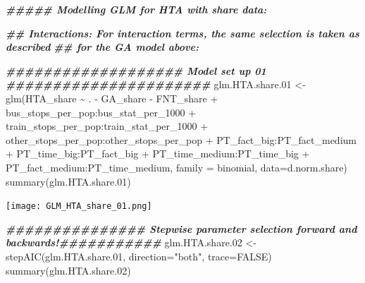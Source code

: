 \documentclass[
]{article}
\newenvironment{Shaded}{\begin{snugshade}}{\end{snugshade}}
\newcommand{\AttributeTok}[1]{\textcolor[rgb]{0.77,0.63,0.00}{#1}}
\newcommand{\ConstantTok}[1]{\textcolor[rgb]{0.00,0.00,0.00}{#1}}
\newcommand{\DocumentationTok}[1]{\textcolor[rgb]{0.56,0.35,0.01}{\textbf{\textit{#1}}}}
\newcommand{\FloatTok}[1]{\textcolor[rgb]{0.00,0.00,0.81}{#1}}
\newcommand{\FunctionTok}[1]{\textcolor[rgb]{0.00,0.00,0.00}{#1}}
\newcommand{\NormalTok}[1]{#1}
\newcommand{\OtherTok}[1]{\textcolor[rgb]{0.56,0.35,0.01}{#1}}
\newcommand{\SpecialCharTok}[1]{\textcolor[rgb]{0.00,0.00,0.00}{#1}}
\newcommand{\StringTok}[1]{\textcolor[rgb]{0.31,0.60,0.02}{#1}}
\begin{document}
\begin{Shaded}
\begin{Highlighting}[]
\DocumentationTok{\#\#\#\#\#  Modelling GLM for HTA with share data:}

\DocumentationTok{\#\# Interactions: For interaction terms, the same selection is taken as described}
\DocumentationTok{\#\# for the GA model above:}

\DocumentationTok{\#\#\#\#\#\#\#\#\#\#\#\#\#\#\#\#\#\#\# Model set up 01 \#\#\#\#\#\#\#\#\#\#\#\#\#\#\#\#\#\#\#\#\#\#}
\NormalTok{glm.HTA.share}\FloatTok{.01} \OtherTok{\textless{}{-}} \FunctionTok{glm}\NormalTok{(HTA\_share }\SpecialCharTok{\textasciitilde{}}\NormalTok{ . }\SpecialCharTok{{-}}\NormalTok{ GA\_share }\SpecialCharTok{{-}}\NormalTok{ FNT\_share}
                    \SpecialCharTok{+}\NormalTok{ bus\_stops\_per\_pop}\SpecialCharTok{:}\NormalTok{bus\_stat\_per\_1000}
                    \SpecialCharTok{+}\NormalTok{ train\_stops\_per\_pop}\SpecialCharTok{:}\NormalTok{train\_stat\_per\_1000}
                    \SpecialCharTok{+}\NormalTok{ other\_stops\_per\_pop}\SpecialCharTok{:}\NormalTok{other\_stops\_per\_pop}
                    \SpecialCharTok{+}\NormalTok{ PT\_fact\_big}\SpecialCharTok{:}\NormalTok{PT\_fact\_medium}
                    \SpecialCharTok{+}\NormalTok{ PT\_time\_big}\SpecialCharTok{:}\NormalTok{PT\_fact\_big}
                    \SpecialCharTok{+}\NormalTok{ PT\_time\_medium}\SpecialCharTok{:}\NormalTok{PT\_time\_big}
                    \SpecialCharTok{+}\NormalTok{ PT\_fact\_medium}\SpecialCharTok{:}\NormalTok{PT\_time\_medium, }
                \AttributeTok{family =}\NormalTok{ binomial, }\AttributeTok{data=}\NormalTok{d.norm.share)}
\FunctionTok{summary}\NormalTok{(glm.HTA.share}\FloatTok{.01}\NormalTok{)}
\end{Highlighting}
\end{Shaded}

\texttt{[image: GLM\_HTA\_share\_01.png]}

\begin{Shaded}
\begin{Highlighting}[]
\DocumentationTok{\#\#\#\#\#\#\#\#\#\#\#\#\#\#\# Stepwise parameter selection forward and backwards!\#\#\#\#\#\#\#\#\#\#\#}
\NormalTok{glm.HTA.share}\FloatTok{.02} \OtherTok{\textless{}{-}} \FunctionTok{stepAIC}\NormalTok{(glm.HTA.share}\FloatTok{.01}\NormalTok{, }\AttributeTok{direction=}\StringTok{"both"}\NormalTok{, }\AttributeTok{trace=}\ConstantTok{FALSE}\NormalTok{)}
\FunctionTok{summary}\NormalTok{(glm.HTA.share}\FloatTok{.02}\NormalTok{)}
\end{Highlighting}
\end{Shaded}
\end{document}
